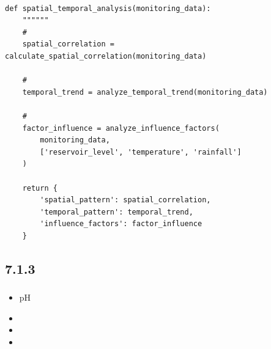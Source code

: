 \hypertarget{section-58}{%
\paragraph{}\label{section-58}}

\begin{lstlisting}[style=python]
def spatial_temporal_analysis(monitoring_data):
    """"""
    # 
    spatial_correlation = calculate_spatial_correlation(monitoring_data)
    
    # 
    temporal_trend = analyze_temporal_trend(monitoring_data)
    
    # 
    factor_influence = analyze_influence_factors(
        monitoring_data, 
        ['reservoir_level', 'temperature', 'rainfall']
    )
    
    return {
        'spatial_pattern': spatial_correlation,
        'temporal_pattern': temporal_trend,
        'influence_factors': factor_influence
    }
\end{lstlisting}

\hypertarget{section-59}{%
\subsection{7.1.3}\label{section-59}}

\hypertarget{section-60}{%
\subsubsection{}\label{section-60}}

\hypertarget{section-61}{%
\paragraph{}\label{section-61}}

\begin{itemize}
\item
  \important{}pH
\item
  \important{}
\item
  \important{}
\item
  \important{}
\end{itemize}

